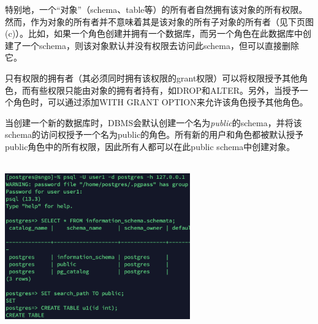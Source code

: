 \par
特别地，一个“对象”（schema、table等）的所有者自然拥有该对象的所有权限。然而，作为对象的所有者并不意味着其是该对象的所有子对象的所有者（见下页图(c)）。比如，如果一个角色创建并拥有一个数据库，而另一个角色在此数据库中创建了一个schema，则该对象默认并没有权限去访问此schema，但可以直接删除它。
\par
只有权限的拥有者（其必须同时拥有该权限的grant权限）可以将权限授予其他角色，而有些权限只能由对象的拥有者持有，如DROP和ALTER。另外，当授予一个角色时，可以通过添加WITH GRANT OPTION来允许该角色授予其他角色。
\par
当创建一个新的数据库时，DBMS会默认创建一个名为\emph{public}的schema，并将该schema的访问权授予一个名为public的角色。所有新的用户和角色都被默认授予public角色中的所有权限，因此所有人都可以在此public schema中创建对象。\\~\\
\centerline{\includegraphics[width=0.6\textwidth]{./pic/mov.png}}

